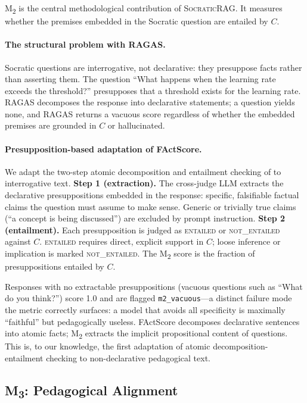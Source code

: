 \documentclass[11pt]{article}
\newcommand{\ours}{\textsc{SocraticRAG}\xspace}
\newcommand{\mtwo}{M\textsubscript{2}\xspace}
\newcommand{\mthree}{M\textsubscript{3}\xspace}
\begin{document}
\mtwo is the central methodological contribution of \ours.
It measures whether the premises embedded in the Socratic question are
entailed by $C$.

\paragraph{The structural problem with RAGAS.}
Socratic questions are interrogative, not declarative: they presuppose
facts rather than asserting them.
The question ``What happens when the learning rate exceeds the threshold?''
presupposes that a threshold exists for the learning rate.
RAGAS decomposes the response into declarative statements; a question
yields none, and RAGAS returns a vacuous score regardless of whether the
embedded premises are grounded in $C$ or hallucinated.

\paragraph{Presupposition-based adaptation of FActScore.}
We adapt the two-step atomic decomposition and entailment checking of
\citet{min2023factscore} to interrogative text.
\textbf{Step 1 (extraction).} The cross-judge LLM extracts the declarative
presuppositions embedded in the response: specific, falsifiable factual claims
the question must assume to make sense.
Generic or trivially true claims (``a concept is being discussed'') are
excluded by prompt instruction.
\textbf{Step 2 (entailment).} Each presupposition is judged as
\textsc{entailed} or \textsc{not\_entailed} against $C$.
\textsc{entailed} requires direct, explicit support in $C$; loose inference
or implication is marked \textsc{not\_entailed}.
The \mtwo score is the fraction of presuppositions entailed by $C$.

Responses with no extractable presuppositions (vacuous questions such as
``What do you think?'') score 1.0 and are flagged \texttt{m2\_vacuous}---a
distinct failure mode the metric correctly surfaces: a model that avoids
all specificity is maximally ``faithful'' but pedagogically useless.
FActScore decomposes declarative sentences into atomic facts; \mtwo extracts
the implicit propositional content of questions.
This is, to our knowledge, the first adaptation of atomic
decomposition-entailment checking to non-declarative pedagogical text.

\subsection{\mthree: Pedagogical Alignment}
\end{document}
